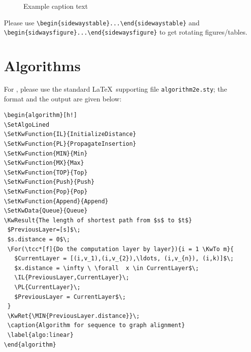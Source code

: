 \documentclass[]{imag-ms-template}
\theoremstyle{plain}
\theoremstyle{remark}
\begin{document}
\begin{figure}


\caption{\label{fig-example_figure}Example caption text}

\end{figure}%

Please use
\texttt{\textbackslash{}begin\{sidewaystable\}...\textbackslash{}end\{sidewaystable\}}
and\\
\texttt{\textbackslash{}begin\{sidwaysfigure\}...\textbackslash{}end\{sidewaysfigure\}}
to get rotating figures/tables.

\section{Algorithms}\label{algorithms}

For \verb@Algorithms@, please use the standard \LaTeX~supporting file
\verb!algorithm2e.sty!; the format and the output are given below:

\begin{verbatim}
\begin{algorithm}[h!]
\SetAlgoLined
\SetKwFunction{IL}{InitializeDistance}
\SetKwFunction{PL}{PropagateInsertion}
\SetKwFunction{MIN}{Min}
\SetKwFunction{MX}{Max}
\SetKwFunction{TOP}{Top}
\SetKwFunction{Push}{Push}
\SetKwFunction{Pop}{Pop}
\SetKwFunction{Append}{Append}
\SetKwData{Queue}{Queue}
\KwResult{The length of shortest path from $s$ to $t$}
 $PreviousLayer=[s]$\;
 $s.distance = 0$\;
 \For(\tcc*[f]{Do the computation layer by layer}){i = 1 \KwTo m}{
   $CurrentLayer = [(i,v_1),(i,v_{2}),\ldots, (i,v_{n}), (i,k)]$\;
   $x.distance = \infty \ \forall  x \in CurrentLayer$\;
   \IL{PreviousLayer,CurrentLayer}\;
   \PL{CurrentLayer}\;
   $PreviousLayer = CurrentLayer$\;
 }
 \KwRet{\MIN{PreviousLayer.distance}}\;
 \caption{Algorithm for sequence to graph alignment}
 \label{algo:linear}
\end{algorithm}
\end{verbatim}
\end{document}
